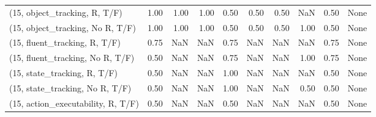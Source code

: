\begin{table*}[h!]
\begin{adjustbox}{width=2\columnwidth,center}
\begin{tabular}{lrrr|rrr|rrr}
\midrule
(15, object\_tracking, R, T/F)         &                      1.00 &                  1.00 &                      1.00 &                          0.50 &                      0.50 &                          0.50 &                                    NaN &                               0.50 &                                  None \\
(15, object\_tracking, No R, T/F)      &                      1.00 &                  1.00 &                      1.00 &                          0.50 &                      0.50 &                          0.50 &                                   1.00 &                               0.50 &                                  None \\
(15, fluent\_tracking, R, T/F)         &                      0.75 &                   NaN &                       NaN &                          0.75 &                       NaN &                           NaN &                                    NaN &                               0.75 &                                  None \\
(15, fluent\_tracking, No R, T/F)      &                      0.50 &                   NaN &                       NaN &                          0.75 &                       NaN &                           NaN &                                   1.00 &                               0.75 &                                  None \\
(15, state\_tracking, R, T/F)          &                      0.50 &                   NaN &                       NaN &                          1.00 &                       NaN &                           NaN &                                    NaN &                               0.50 &                                  None \\
(15, state\_tracking, No R, T/F)       &                      0.50 &                   NaN &                       NaN &                          1.00 &                       NaN &                           NaN &                                   0.50 &                               0.50 &                                  None \\
(15, action\_executability, R, T/F)    &                      0.50 &                   NaN &                       NaN &                          0.50 &                       NaN &                           NaN &                                    NaN &                               0.50 &                                  None \\

\end{tabular}
\end{adjustbox}
\end{table*}
